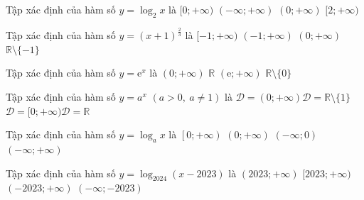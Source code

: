 \begin{ex}%
	Tập xác định của  hàm số $y=\log_2x$ là
	 \choice
		 {$[0;+\infty)$}
		 {$(-\infty;+\infty)$}
		{\True  $(0;+\infty)$}
		{$[2;+\infty)$} 
\end{ex}

\begin{ex}%
	Tập xác định của hàm số $y=(x+1)^{\tfrac{2}{3}}$ là 
	\choice 
		 {$[-1;+\infty)$}
		{\True  $(-1;+\infty)$}
		 {$(0;+\infty)$}
		{$\mathbb{R}  \setminus\{-1\}$}
\end{ex}

\begin{ex}%
	Tập xác định của  hàm số $y=\mathrm{e}^x$ là
	\choice 
		{$(0;+\infty)$} 
		 {\True $\mathbb{R}$}
		 {$(\mathrm{e};+\infty)$}
		{$\mathbb{R} \setminus\{0\}$} 
\end{ex}

\begin{ex}%
	Tập xác định của hàm số $y=a^x$ $(a>0,~ a \ne 1)$ là 
	\choice 
		 {$\mathscr{D}=(0;+\infty)$}{$\mathscr{D}=\mathbb{R}\setminus\{1\}$}{$\mathscr{D}=[0;+\infty)$}{\True $\mathscr{D}=\mathbb{R}$}
\end{ex}

\begin{ex}%
	Tập xác định của  hàm số $y=\log_a x$ là
	\choice 
		 { $\left[0;+\infty\right)$}
		{\True $\left(0;+\infty\right)$} 
		{$\left(-\infty;0\right)$} 
		{$\left(-\infty;+\infty\right)$} 
\end{ex}

\begin{ex}%
	Tập xác định của hàm số $y=\log _{2024}(x-2023)$ là 
	\choice 
		 {\True $(2023;+\infty)$}
		 {$[2023;+\infty)$}
		{$(-2023;+\infty)$} 
		{$(-\infty;-2023)$} 
\end{ex}

